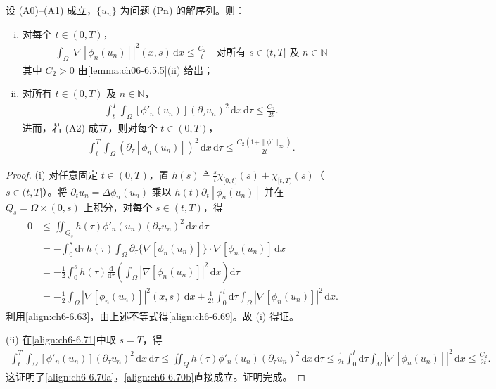 \documentclass[../../main.tex]{subfiles}%
\begin{document}
\begin{lemma}\label{lemma:ch06-6.5.7}
设 (A0)--(A1) 成立，$\{u_n\}$ 为问题 (Pn) 的解序列。则：
\begin{enumerate}[(i)]
\item 对每个 $t\in(0,T)$，
\begin{align}
\int_\Omega|\nabla[\phi_n(u_n)]|^2(x,s)\,\mathrm{d}x\leqslant\frac{C_2}{t}
\quad\text{对所有 }s\in(t,T]\text{ 及 }n\in\mathbb{N} \label{align:ch6-6.69}
\end{align}
其中 $C_2>0$ 由\cref{lemma:ch06-6.5.5}(ii) 给出；
\item 对所有 $t\in(0,T)$ 及 $n\in\mathbb{N}$，
\begin{align}
\int_t^T\int_\Omega[\phi'_n(u_n)](\partial_\tau u_n)^2\,\mathrm{d}x\,\mathrm{d}\tau
\leqslant\frac{C_2}{2t}. \label{align:ch6-6.70a}
\end{align}
进而，若 (A2) 成立，则对每个 $t\in(0,T)$，
\begin{align}
\int_t^T\int_\Omega(\partial_\tau[\phi_n(u_n)])^2\,\mathrm{d}x\,\mathrm{d}\tau
\leqslant\frac{C_2(1+\|\phi'\|_\infty)}{2t}. \label{align:ch6-6.70b}
\end{align}
\end{enumerate}
\end{lemma}

\begin{proof}
(i) 对任意固定 $t\in(0,T)$，置 $h(s)\triangleq \frac{s}{t}\chi_{[0,t)}(s)+\chi_{[t,T)}(s)$（$s\in(t,T]$）。将 $\partial_t u_n=\Delta\phi_n(u_n)$ 乘以 $h(t)\partial_t[\phi_n(u_n)]$ 并在 $Q_s=\Omega\times(0,s)$ 上积分，对每个 $s\in(t,T)$，得
\begin{align}
\begin{aligned}
0&\leqslant\iint_{Q_s}h(\tau)\phi'_n(u_n)(\partial_\tau u_n)^2\,\mathrm{d}x\,\mathrm{d}\tau\\
&=-\int_0^s\mathrm{d}\tau\,h(\tau)\int_\Omega\partial_\tau\{\nabla[\phi_n(u_n)]\}\cdot\nabla[\phi_n(u_n)]\,\mathrm{d}x\\
&=-\frac{1}{2}\int_0^s h(\tau)\frac{\mathrm{d}}{\mathrm{d}\tau}\left(\int_\Omega|\nabla[\phi_n(u_n)]|^2\,\mathrm{d}x\right)\mathrm{d}\tau\\
&=-\frac{1}{2}\int_\Omega|\nabla[\phi_n(u_n)]|^2(x,s)\,\mathrm{d}x
+\frac{1}{2t}\int_0^t\mathrm{d}\tau\int_\Omega|\nabla[\phi_n(u_n)]|^2\,\mathrm{d}x.
\end{aligned} \label{align:ch6-6.71}
\end{align}
利用\eqref{align:ch6-6.63}，由上述不等式得\eqref{align:ch6-6.69}。故 (i) 得证。

(ii) 在\eqref{align:ch6-6.71}中取 $s=T$，得
\begin{align*}
\int_t^T\int_\Omega[\phi'_n(u_n)](\partial_\tau u_n)^2\,\mathrm{d}x\,\mathrm{d}\tau
\leqslant\iint_Q h(\tau)\phi'_n(u_n)(\partial_\tau u_n)^2\,\mathrm{d}x\,\mathrm{d}\tau
\leqslant\frac{1}{2t}\int_0^t\mathrm{d}\tau\int_\Omega|\nabla[\phi_n(u_n)]|^2\,\mathrm{d}x
\leqslant\frac{C_2}{2t}.
\end{align*}
这证明了\eqref{align:ch6-6.70a}，\eqref{align:ch6-6.70b}直接成立。证明完成。
\end{proof}
\end{document}
